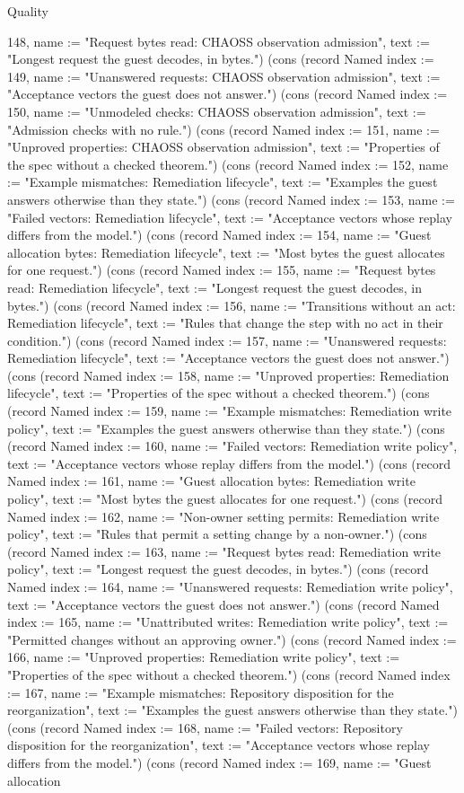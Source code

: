 \begin{lexlean}{Quality}
\begin{semanticmodule}
{148, name := "Request bytes read: CHAOSS observation admission", text := "Longest request the guest decodes, in bytes."}) (cons (record Named {index := 149, name := "Unanswered requests: CHAOSS observation admission", text := "Acceptance vectors the guest does not answer."}) (cons (record Named {index := 150, name := "Unmodeled checks: CHAOSS observation admission", text := "Admission checks with no rule."}) (cons (record Named {index := 151, name := "Unproved properties: CHAOSS observation admission", text := "Properties of the spec without a checked theorem."}) (cons (record Named {index := 152, name := "Example mismatches: Remediation lifecycle", text := "Examples the guest answers otherwise than they state."}) (cons (record Named {index := 153, name := "Failed vectors: Remediation lifecycle", text := "Acceptance vectors whose replay differs from the model."}) (cons (record Named {index := 154, name := "Guest allocation bytes: Remediation lifecycle", text := "Most bytes the guest allocates for one request."}) (cons (record Named {index := 155, name := "Request bytes read: Remediation lifecycle", text := "Longest request the guest decodes, in bytes."}) (cons (record Named {index := 156, name := "Transitions without an act: Remediation lifecycle", text := "Rules that change the step with no act in their condition."}) (cons (record Named {index := 157, name := "Unanswered requests: Remediation lifecycle", text := "Acceptance vectors the guest does not answer."}) (cons (record Named {index := 158, name := "Unproved properties: Remediation lifecycle", text := "Properties of the spec without a checked theorem."}) (cons (record Named {index := 159, name := "Example mismatches: Remediation write policy", text := "Examples the guest answers otherwise than they state."}) (cons (record Named {index := 160, name := "Failed vectors: Remediation write policy", text := "Acceptance vectors whose replay differs from the model."}) (cons (record Named {index := 161, name := "Guest allocation bytes: Remediation write policy", text := "Most bytes the guest allocates for one request."}) (cons (record Named {index := 162, name := "Non-owner setting permits: Remediation write policy", text := "Rules that permit a setting change by a non-owner."}) (cons (record Named {index := 163, name := "Request bytes read: Remediation write policy", text := "Longest request the guest decodes, in bytes."}) (cons (record Named {index := 164, name := "Unanswered requests: Remediation write policy", text := "Acceptance vectors the guest does not answer."}) (cons (record Named {index := 165, name := "Unattributed writes: Remediation write policy", text := "Permitted changes without an approving owner."}) (cons (record Named {index := 166, name := "Unproved properties: Remediation write policy", text := "Properties of the spec without a checked theorem."}) (cons (record Named {index := 167, name := "Example mismatches: Repository disposition for the reorganization", text := "Examples the guest answers otherwise than they state."}) (cons (record Named {index := 168, name := "Failed vectors: Repository disposition for the reorganization", text := "Acceptance vectors whose replay differs from the model."}) (cons (record Named {index := 169, name := "Guest allocation }
\end{semanticmodule}
\end{lexlean}
